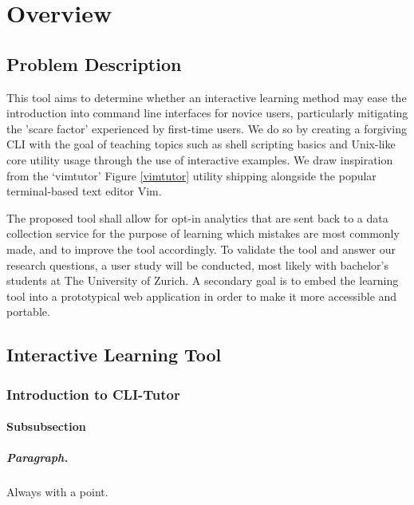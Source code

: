 \chapter{Overview}
%
\section{Problem Description}
This tool aims to determine whether an interactive learning method may ease the
introduction into command line interfaces for novice users, particularly
mitigating the 'scare factor' experienced by first-time users. We do so by
creating a forgiving CLI with the goal of teaching topics such as shell
scripting basics and Unix-like core utility usage through the use of
interactive examples. We draw inspiration from the
`vimtutor'\cite{pierce_ware_smith_moolenaar_2019} Figure \ref{vimtutor} utility
shipping alongside the popular terminal-based text editor Vim. 

The proposed tool shall allow for opt-in analytics that are sent back to a data
collection service for the purpose of learning which mistakes are most commonly
made, and to improve the tool accordingly. To validate the tool and answer our
research questions, a user study will be conducted, most likely with bachelor's
students at The University of Zurich. A secondary goal is to embed the learning
tool into a prototypical web application in order to make it more accessible
and portable.
%

\section{Interactive Learning Tool}
\subsection{Introduction to CLI-Tutor}
\subsubsection{Subsubsection}

\paragraph{Paragraph.} Always with a point.

